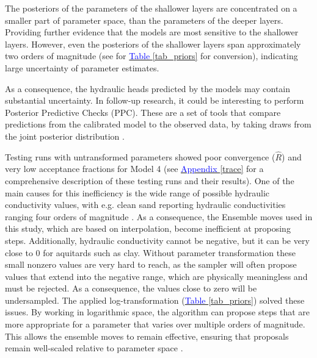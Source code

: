 The posteriors of the parameters of the shallower layers are concentrated on a smaller part of parameter space, than the parameters of the deeper layers. Providing further evidence that the models are most sensitive to the shallower layers. However, even the posteriors of the shallower layers span approximately two orders of magnitude (see for \hyperref[tab_priors]{\textcolor{blue}{Table }\ref{tab_priors}} for conversion), indicating large uncertainty of parameter estimates. 

As a consequence, the hydraulic heads predicted by the models may contain substantial uncertainty. In follow-up research, it could be interesting to perform Posterior Predictive Checks (PPC). These are a set of tools that compare predictions from the calibrated model to the observed data, by taking draws from the joint posterior distribution \citep{gelman2021bayesian}. %

Testing runs with untransformed parameters showed poor convergence ($\hat{R}$) and very low acceptance fractions for Model 4 (see \hyperref[trace]{\textcolor{blue}{Appendix }\ref{trace}} for a comprehensive description of these testing runs and their results). One of the main causes for this inefficiency is the wide range of possible hydraulic conductivity values, with e.g. clean sand reporting hydraulic conductivities ranging four orders of magnitude \citep{woessner2020hydrogeologic}. As a consequence, the Ensemble moves used in this study, which are based on interpolation, become inefficient at proposing steps. Additionally, hydraulic conductivity cannot be negative, but it can be very close to 0 for aquitards such as clay. Without parameter transformation these small nonzero values are very hard to reach, as the sampler will often propose values that extend into the negative range, which are physically meaningless and must be rejected. As a consequence, the values close to zero will be undersampled. The applied log-transformation (\hyperref[tab_priors]{\textcolor{blue}{Table }\ref{tab_priors}}) solved these issues. By working in logarithmic space, the algorithm can propose steps that are more appropriate for a parameter that varies over multiple orders of magnitude. This allows the ensemble moves to remain effective, ensuring that proposals remain well-scaled relative to parameter space \citep{sas2020example}. 

